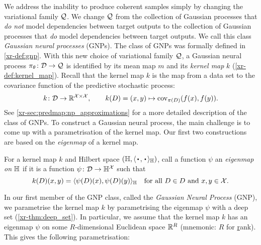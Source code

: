 \documentclass[12pt]{report}
\newcommand{\xrprefix}[1]{xr-#1}
\begin{document}
We address the inability to produce coherent samples simply by changing the variational family $\Qc$.
We change $\Qc$ from the collection of Gaussian processes that \emph{do not} model dependencies between target outputs to the collection of Gaussian processes that \emph{do} model dependencies between target outputs.
We call this class \emph{Gaussian neural processes} (GNPs).
The class of GNPs was formally defined in \cref{\xrprefix{def:gnp}}.
With this new choice of variational family $\Qc$, a Gaussian neural process $\pi_\theta\colon \D \to \Qc$ is identified by its mean map $m$ and its \emph{kernel map} $k$ (\cref{\xrprefix{def:kernel_map}}).
Recall that the kernel map $k$ is the map from a data set to the covariance function of the predictive stochastic process:
\begin{equation}
    k\colon\D \to \R^{\X\times\X}, 
    \qquad
    k(D) = (x, y) \mapsto \cov_{\pi(D)}(f(x), f(y)).
\end{equation}
See \cref{\xrprefix{sec:predmap:np_approximations}} for a more detailed description of the class of GNPs.
To construct a Gaussian neural process, the main challenge is to come up with a parametrisation of the kernel map.
Our first two constructions are based on the \emph{eigenmap} of a kernel map.

\begin{definition}[Eigenmap]
    \label{def:eigenmap}
    For a kernel map $k$ and Hilbert space $(\Hb, \lra{\vardot, \vardot}_\Hb)$, call a function $\psi$ an \emph{eigenmap on $\Hb$} if it is a function $\psi \colon \D \to \Hb^\X$ such that
    \begin{equation} \label{eq:eigenmap}
        k(D)(x, y) = \lra{\psi(D)(x), \psi(D)(y)}_{\Hb}
        \quad
        \text{for all $D \in D$ and $x, y \in \X$}.
    \end{equation}
\end{definition}

In our first member of the GNP class, called the \emph{Gaussian Neural Process} (GNP), we
parametrise the kernel map $k$ by parametrising the eigenmap $\psi$ with a deep set (\cref{\xrprefix{thm:deep_set}}).
In particular, we assume that the kernel map $k$ has an eigenmap $\psi$ on some $R$-dimensional Euclidean space $\R^R$ (mnemonic: $R$ for \underline{r}ank).
This gives the following parametrisation:
\end{document}
